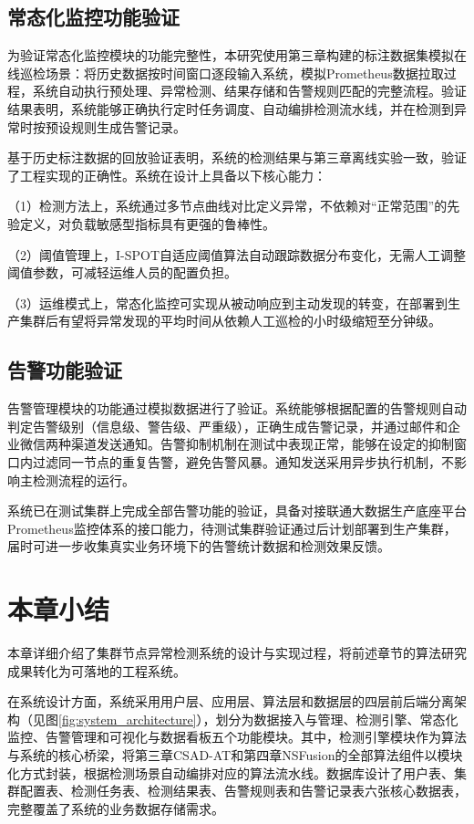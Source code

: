 \subsection{常态化监控功能验证}

为验证常态化监控模块的功能完整性，本研究使用第三章构建的标注数据集模拟在线巡检场景：将历史数据按时间窗口逐段输入系统，模拟Prometheus数据拉取过程，系统自动执行预处理、异常检测、结果存储和告警规则匹配的完整流程。验证结果表明，系统能够正确执行定时任务调度、自动编排检测流水线，并在检测到异常时按预设规则生成告警记录。

基于历史标注数据的回放验证表明，系统的检测结果与第三章离线实验一致，验证了工程实现的正确性。系统在设计上具备以下核心能力：

（1）检测方法上，系统通过多节点曲线对比定义异常，不依赖对``正常范围''的先验定义，对负载敏感型指标具有更强的鲁棒性。

（2）阈值管理上，I-SPOT自适应阈值算法自动跟踪数据分布变化，无需人工调整阈值参数，可减轻运维人员的配置负担。

（3）运维模式上，常态化监控可实现从被动响应到主动发现的转变，在部署到生产集群后有望将异常发现的平均时间从依赖人工巡检的小时级缩短至分钟级。

\subsection{告警功能验证}

告警管理模块的功能通过模拟数据进行了验证。系统能够根据配置的告警规则自动判定告警级别（信息级、警告级、严重级），正确生成告警记录，并通过邮件和企业微信两种渠道发送通知。告警抑制机制在测试中表现正常，能够在设定的抑制窗口内过滤同一节点的重复告警，避免告警风暴。通知发送采用异步执行机制，不影响主检测流程的运行。

系统已在测试集群上完成全部告警功能的验证，具备对接联通大数据生产底座平台Prometheus监控体系的接口能力，待测试集群验证通过后计划部署到生产集群，届时可进一步收集真实业务环境下的告警统计数据和检测效果反馈。

\section{本章小结}

本章详细介绍了集群节点异常检测系统的设计与实现过程，将前述章节的算法研究成果转化为可落地的工程系统。

在系统设计方面，系统采用用户层、应用层、算法层和数据层的四层前后端分离架构（见图\ref{fig:system_architecture}），划分为数据接入与管理、检测引擎、常态化监控、告警管理和可视化与数据看板五个功能模块。其中，检测引擎模块作为算法与系统的核心桥梁，将第三章CSAD-AT和第四章NSFusion的全部算法组件以模块化方式封装，根据检测场景自动编排对应的算法流水线。数据库设计了用户表、集群配置表、检测任务表、检测结果表、告警规则表和告警记录表六张核心数据表，完整覆盖了系统的业务数据存储需求。

